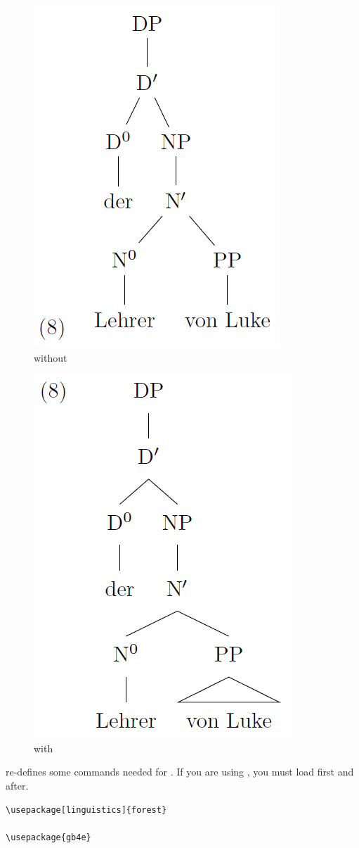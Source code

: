 \begin{frame}[fragile]
\begin{minipage}[b]{.48\textwidth}
\begin{figure}
	\centering
	\includegraphics[width=.4\linewidth]{../../texfiles-beamer/tex-material/WissArb-latex/forest2}	
	\caption{without }
\end{figure}
\end{minipage}
\begin{minipage}[b]{.48\textwidth}
\begin{figure}
	\centering
	\includegraphics[width=.43\linewidth]{../../texfiles-beamer/tex-material/WissArb-latex/forest1}
	\caption{with }	
\end{figure}
\end{minipage}

\end{frame}


\begin{frame}[fragile]

 re-defines some commands needed for . If you are using , you must load  \alert{ first} and \alert{ after}.

\begin{lstlisting}
\usepackage[linguistics]{forest}

\usepackage{gb4e}
\end{lstlisting}

\end{frame}


